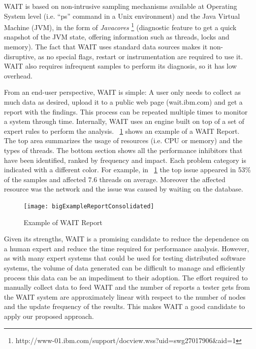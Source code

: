 \documentclass[runningheads,a4paper]{llncs}
\begin{document}
WAIT is based on non-intrusive sampling mechanisms available at
Operating System level (i.e. ``ps'' command in a Unix environment) and the Java
Virtual Machine (JVM), in the form of \emph{Javacores}
\footnote{http://www-01.ibm.com/support/docview.wss?uid=swg27017906\&aid=1}
(diagnostic feature to get a quick snapshot of the JVM state, offering
information such as threads, locks and memory). The fact that WAIT uses standard
data sources makes it non-disruptive, as no special flags, restart
or instrumentation are required to use it. WAIT also requires infrequent
samples to perform its diagnosis, so it has low overhead.

From an end-user perspective, WAIT is simple: A user only needs to
collect as much data as desired, upload it to a public web page (wait.ibm.com)
and get a report with the findings. This process can be repeated multiple times to monitor a
system through time. Internally, WAIT uses an engine built on top of a set of 
expert rules to perform the analysis. \figurename ~\ref{fig_WAITReport} shows an
example of a WAIT Report. The top area summarizes the usage of resources (i.e.
CPU or memory) and the types of threads. The bottom section shows all
the performance inhibitors that have been identified, ranked by frequency and impact. 
Each problem category is indicated with a different color. For example, in
\figurename ~\ref{fig_WAITReport} the top issue appeared in 53\% of the samples and 
affected 7.6 threads on average. Moreover the affected resource was the
network and the issue was caused by waiting on the database.

\begin{figure}[!h]
\centering
\texttt{[image: bigExampleReportConsolidated]}
\caption{Example of WAIT Report}
\label{fig_WAITReport}
\end{figure}

Given its strengths, WAIT is a promising candidate to reduce the
dependence on a human expert and reduce the time required for performance 
analysis. However, as with many expert systems that could be used for testing 
distributed software systems, the volume of data generated can be difficult to 
manage and efficiently process this data can be an impediment to their
adoption. The effort required to manually collect data to feed WAIT and the number 
of reports a tester gets from the WAIT system are approximately linear with
respect to the number of nodes and the update frequency of the results. This makes 
WAIT a good candidate to apply our proposed approach.
\end{document}

